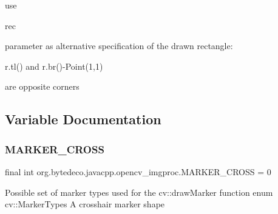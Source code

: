 use
\begin{DoxyCode}
rec 
\end{DoxyCode}
 parameter as alternative specification of the drawn rectangle\+:
\begin{DoxyCode}
 r.tl() and
r.br()-Point(1,1) 
\end{DoxyCode}
 are opposite corners 

\subsection{Variable Documentation}
\mbox{\label{group__imgproc__draw_gad3b5af2fc44e8c67ac0c7f607d59d724}} 
\subsubsection{\texorpdfstring{M\+A\+R\+K\+E\+R\+\_\+\+C\+R\+O\+SS}{MARKER\_CROSS}}
{\footnotesize\ttfamily final int org.\+bytedeco.\+javacpp.\+opencv\+\_\+imgproc.\+M\+A\+R\+K\+E\+R\+\_\+\+C\+R\+O\+SS = 0\hspace{0.3cm}{\ttfamily [static]}}

Possible set of marker types used for the cv\+::draw\+Marker function enum cv\+::\+Marker\+Types A crosshair marker shape 
